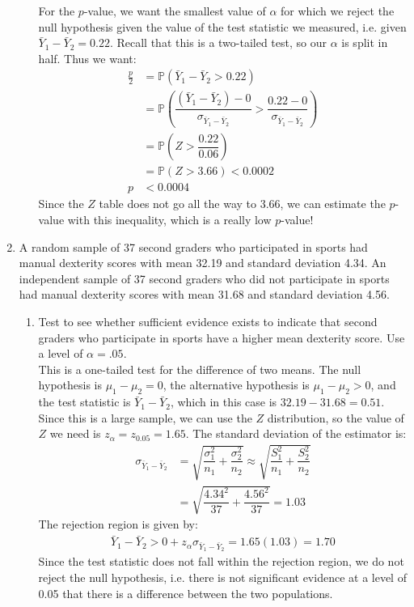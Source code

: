 \documentclass[12pt]{article}
\def\P{{\mathbb P}}
\begin{document}
\begin{enumerate}
\begin{enumerate}
For the $p$-value, we want the smallest value of $\alpha$ for which we reject the null hypothesis given the value of the test statistic we measured, i.e. given $\bar{Y}_1 - \bar{Y}_2 = 0.22$. Recall that this is a two-tailed test, so our $\alpha$ is split in half. Thus we want:
\begin{align*}
\frac{p}{2} &= \P( \bar{Y}_1 - \bar{Y}_2 > 0.22) \\
&= \P\left( \dfrac{ (\bar{Y}_1 - \bar{Y}_2) - 0 }{ \sigma_{\bar{Y}_1 - \bar{Y}_2} } > \dfrac{ 0.22 - 0 }{ \sigma_{\bar{Y}_1 - \bar{Y}_2} } \right) \\
&= \P\left(Z  > \dfrac{ 0.22 }{ 0.06 } \right)\\
&= \P(Z > 3.66 ) < 0.0002 \\
p &< 0.0004
\end{align*}
Since the $Z$ table does not go all the way to 3.66, we can estimate the $p$-value with this inequality, which is a really low $p$-value!
\end{enumerate}

\item A random sample of 37 second graders who participated in sports had manual dexterity scores with mean 32.19 and standard deviation 4.34. An independent sample of 37 second graders who did not participate in sports had manual dexterity scores with mean 31.68 and standard deviation 4.56.
\begin{enumerate}
\item Test to see whether sufficient evidence exists to indicate that second graders who participate in sports have a higher mean dexterity score. Use a level of $\alpha = .05$.\\

This is a one-tailed test for the difference of two means. The null hypothesis is $\mu_1 - \mu_2 = 0$, the alternative hypothesis is $\mu_1 - \mu_2 > 0$, and the test statistic is $\bar{Y}_1 - \bar{Y}_2$, which in this case is $32.19 - 31.68 = 0.51$. Since this is a large sample, we can use the $Z$ distribution, so the value of $Z$ we need is $z_\alpha = z_{0.05} = 1.65$. The standard deviation of the estimator is:
\begin{align*}
\sigma_{\bar{Y}_1 - \bar{Y}_2} &= \sqrt{ \dfrac{\sigma^2_1}{n_1} + \dfrac{\sigma^2_2}{n_2} } \approx \sqrt{ \dfrac{S^2_1}{n_1} + \dfrac{S^2_2}{n_2} } \\
&= \sqrt{ \dfrac{4.34^2}{37} + \dfrac{4.56^2}{37} } = 1.03
\end{align*}
The rejection region is given by:
\begin{align*}
\bar{Y}_1 - \bar{Y}_2 > 0 + z_\alpha \sigma_{\bar{Y}_1 - \bar{Y}_2} = 1.65(1.03) = 1.70
\end{align*}
Since the test statistic does not fall within the rejection region, we do not reject the null hypothesis, i.e. there is not significant evidence at a level of 0.05 that there is a difference between the two populations.


\end{enumerate}
\end{enumerate}
\end{document}

